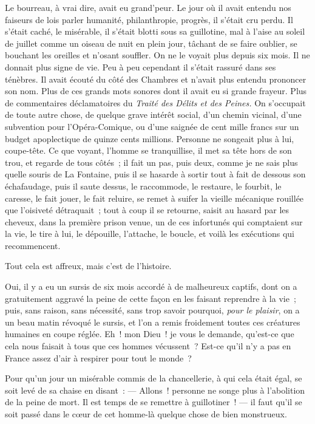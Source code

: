 \documentclass[french,twoside]{book} %
\begin{document}
Le bourreau, à vrai dire, avait eu grand’peur. Le jour où il avait entendu nos faiseurs de lois parler humanité, philanthropie, progrès, il s’était cru perdu. Il s’était caché, le misérable, il s’était blotti sous sa guillotine, mal à l’aise au soleil de juillet comme un oiseau de nuit en plein jour, tâchant de se faire oublier, se bouchant les oreilles et n’osant souffler. On ne le voyait plus depuis six mois. Il ne donnait plus signe de vie. Peu à peu cependant il s’était rassuré dans ses ténèbres. Il avait écouté du côté des Chambres et n’avait plus entendu prononcer son nom. Plus de ces grands mots sonores dont il avait eu si grande frayeur. Plus de commentaires déclamatoires du \emph{Traité des Délits et des Peines.} On s’occupait de toute autre chose, de quelque grave intérêt social, d’un chemin vicinal, d’une  subvention pour l’Opéra-Comique, ou d’une saignée de cent mille francs sur un budget apoplectique de quinze cents millions. Personne ne songeait plus à lui, coupe-tête. Ce que voyant, l’homme se tranquillise, il met sa tête hors de son trou, et regarde de tous côtés ; il fait un pas, puis deux, comme je ne sais plus quelle souris de La Fontaine, puis il se hasarde à sortir tout à fait de dessous son échafaudage, puis il saute dessus, le raccommode, le restaure, le fourbit, le caresse, le fait jouer, le fait reluire, se remet à suifer la vieille mécanique rouillée que l’oisiveté détraquait ; tout à coup il se retourne, saisit au hasard par les cheveux, dans la première prison venue, un de ces infortunés qui comptaient sur la vie, le tire à lui, le dépouille, l’attache, le boucle, et voilà les exécutions qui recommencent.\par
Tout cela est affreux, mais c’est de l’histoire.\par
Oui, il y a eu un sursis de six mois accordé à de malheureux captifs, dont on a gratuitement aggravé la peine de cette façon en les faisant reprendre à la vie ; puis, sans raison, sans nécessité, sans trop savoir pourquoi, \emph{pour le plaisir}, on a un beau matin révoqué le sursis, et l’on a remis froidement toutes ces créatures humaines en coupe réglée. Eh ! mon Dieu ! je vous le demande, qu’est-ce que cela nous faisait à tous que ces hommes vécussent ? Est-ce qu’il n’y a pas en France assez d’air à respirer pour tout le monde ?\par
Pour qu’un jour un misérable commis de la chancellerie, à qui cela était égal, se soit levé de sa chaise en disant : — Allons ! personne ne songe plus à l’abolition de la peine de mort. Il est temps de se remettre à guillotiner !  — il faut qu’il se soit passé dans le cœur de cet homme-là quelque chose de bien monstrueux.\par
\end{document}
